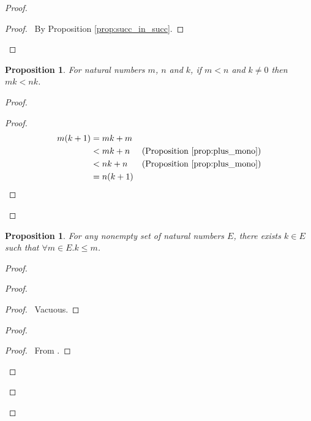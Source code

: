 \documentclass{report}
\let\qed\relax
\newtheorem{prop}[ax]{Proposition}
\theoremstyle{definition}
\begin{document}
\begin{proof}
\pf
{}
\begin{proof}
	\pf\ By Proposition \ref{prop:succ_in_succ}.
\end{proof}
\qed
\end{proof}

\begin{prop}
For natural numbers $m$, $n$ and $k$, if $m < n$ and $k \neq 0$ then $mk < nk$.
\end{prop}

\begin{proof}
\pf
{}
\begin{proof}
	\pf
	\begin{align*}
		m(k+1) & = mk + m \\
		& < mk + n & (\text{Proposition \ref{prop:plus_mono}}) \\
		& < nk + n & (\text{Proposition \ref{prop:plus_mono}}) \\
		& = n(k+1)
	\end{align*}
\end{proof}
\qed
\end{proof}

\begin{prop}
For any nonempty set of natural numbers $E$, there exists $k \in E$ such that $\forall m \in E. k \leq m$.
\end{prop}

\begin{proof}
\pf
{}
\begin{proof}
	\begin{proof}
		\pf\ Vacuous.
	\end{proof}
	\begin{proof}
		\begin{proof}
			\pf\ From .
		\end{proof}
	\end{proof}
\end{proof}
\qed
\end{proof}
\end{document}
